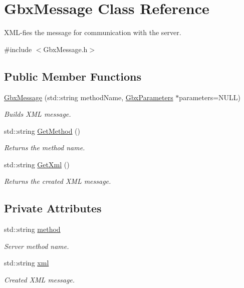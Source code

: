 \hypertarget{classGbxMessage}{\section{Gbx\-Message Class Reference}
\label{classGbxMessage}
}


X\-M\-L-\/fies the message for communication with the server.  




{\ttfamily \#include $<$Gbx\-Message.\-h$>$}

\subsection*{Public Member Functions}
\begin{DoxyCompactItemize}
\item 
\hyperlink{classGbxMessage_aa06aa73544aa343e42a5f19434a05928}{Gbx\-Message} (std\-::string method\-Name, \hyperlink{classGbxParameters}{Gbx\-Parameters} $\ast$parameters=N\-U\-L\-L)
\begin{DoxyCompactList}\small\item\em Builds X\-M\-L message. \end{DoxyCompactList}\item 
std\-::string \hyperlink{classGbxMessage_a53e00a162c293251bef476ad74d0134c}{Get\-Method} ()
\begin{DoxyCompactList}\small\item\em Returns the method name. \end{DoxyCompactList}\item 
std\-::string \hyperlink{classGbxMessage_ac81e16efce7da483a696d6653e18c9d8}{Get\-Xml} ()
\begin{DoxyCompactList}\small\item\em Returns the created X\-M\-L message. \end{DoxyCompactList}\end{DoxyCompactItemize}
\subsection*{Private Attributes}
\begin{DoxyCompactItemize}
\item 
std\-::string \hyperlink{classGbxMessage_a10b6118916999db98f28e3f495eef6b4}{method}
\begin{DoxyCompactList}\small\item\em Server method name. \end{DoxyCompactList}\item 
std\-::string \hyperlink{classGbxMessage_a6ea9adbeb3f1c104fa08fce0b1a4090d}{xml}
\begin{DoxyCompactList}\small\item\em Created X\-M\-L message. \end{DoxyCompactList}\end{DoxyCompactItemize}


